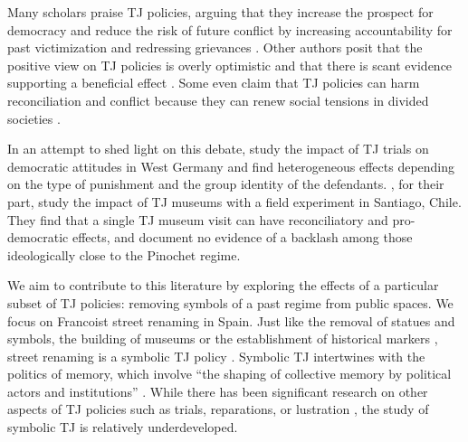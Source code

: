 \documentclass[12pt, titlepage]{article}
\let\footnote=\endnote
\begin{document}
Many scholars praise TJ policies, arguing that they increase the prospect for democracy \citep{Elster:2004aa, Sikkink:2007aa} and reduce the risk of future conflict by increasing accountability for past victimization \citep{Kim:2010aa, Meernik:2010aa} and redressing grievances \citep{Akhavan:1998aa, Loyle:2017aa}. Other authors posit that the positive view on TJ policies is overly optimistic and that there is scant evidence supporting a beneficial effect \citep{Mendeloff:2004aa, Thoms:2010aa}. Some even claim that TJ policies can harm reconciliation and conflict because they can renew social tensions in divided societies \citep{Snyder:2004aa}.

In an attempt to shed light on this debate, \cite{Capoccia:2020aa} study the impact of TJ trials on democratic attitudes in West Germany and find heterogeneous effects depending on the type of punishment and the group identity of the defendants. \cite{Balcells:2020aa}, for their part, study the impact of TJ museums with a field experiment in Santiago, Chile. They find that a single TJ museum visit can have reconciliatory and pro-democratic effects, and document no evidence of a backlash among those ideologically close to the Pinochet regime.

We aim to contribute to this literature by exploring the effects of a particular subset of TJ policies: removing symbols of a past regime from public spaces. We focus on Francoist street renaming in Spain. Just like the removal of statues and symbols, the building of museums or the establishment of historical markers \citep{Ward2021}, street renaming is a symbolic TJ policy \citep{Aguilar:2011aa}. Symbolic TJ intertwines with the politics of memory, which involve ``the shaping of collective memory by political actors and institutions'' \citep[][176]{Zubrzycki:2020aa}. While there has been significant research on other aspects of TJ policies such as trials, reparations, or lustration \citep{Nalepa:2010, Loyle:2017aa, voytas:2021}, the study of symbolic TJ is relatively underdeveloped.
\end{document}
